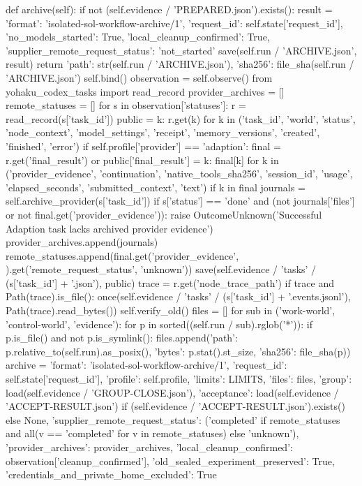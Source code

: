     def archive(self):
        if not (self.evidence / 'PREPARED.json').exists():
            result = {'format': 'isolated-sol-workflow-archive/1',
                      'request_id': self.state['request_id'], 'no_models_started': True,
                      'local_cleanup_confirmed': True, 'supplier_remote_request_status': 'not_started'}
            save(self.run / 'ARCHIVE.json', result)
            return {'path': str(self.run / 'ARCHIVE.json'), 'sha256': file_sha(self.run / 'ARCHIVE.json')}
        self.bind()
        observation = self.observe()
        from yohaku_codex_tasks import read_record
        provider_archives = []
        remote_statuses = []
        for s in observation['statuses']:
            r = read_record(s['task_id'])
            public = {k: r.get(k) for k in ('task_id', 'world', 'status', 'node_context', 'model_settings',
                       'receipt', 'memory_versions', 'created', 'finished', 'error')}
            if self.profile['provider'] == 'adaption':
                final = r.get('final_result') or {}
                public['final_result'] = {k: final[k] for k in
                    ('provider_evidence', 'continuation', 'native_tools_sha256', 'session_id',
                     'usage', 'elapsed_seconds', 'submitted_context', 'text') if k in final}
                journals = self.archive_provider(s['task_id'])
                if s['status'] == 'done' and (not journals['files'] or not final.get('provider_evidence')):
                    raise OutcomeUnknown('Successful Adaption task lacks archived provider evidence')
                provider_archives.append(journals)
                remote_statuses.append(final.get('provider_evidence', {}).get('remote_request_status', 'unknown'))
            save(self.evidence / 'tasks' / (s['task_id'] + '.json'), public)
            trace = r.get('node_trace_path')
            if trace and Path(trace).is_file():
                once(self.evidence / 'tasks' / (s['task_id'] + '.events.jsonl'), Path(trace).read_bytes())
        self.verify_old()
        files = []
        for sub in ('work-world', 'control-world', 'evidence'):
            for p in sorted((self.run / sub).rglob('*')):
                if p.is_file() and not p.is_symlink():
                    files.append({'path': p.relative_to(self.run).as_posix(), 'bytes': p.stat().st_size,
                                  'sha256': file_sha(p)})
        archive = {'format': 'isolated-sol-workflow-archive/1', 'request_id': self.state['request_id'],
                   'profile': self.profile, 'limits': LIMITS, 'files': files,
                   'group': load(self.evidence / 'GROUP-CLOSE.json'),
                   'acceptance': load(self.evidence / 'ACCEPT-RESULT.json') if (self.evidence / 'ACCEPT-RESULT.json').exists() else None,
                   'supplier_remote_request_status': ('completed' if remote_statuses and
                       all(v == 'completed' for v in remote_statuses) else 'unknown'),
                   'provider_archives': provider_archives,
                   'local_cleanup_confirmed': observation['cleanup_confirmed'],
                   'old_sealed_experiment_preserved': True, 'credentials_and_private_home_excluded': True}
